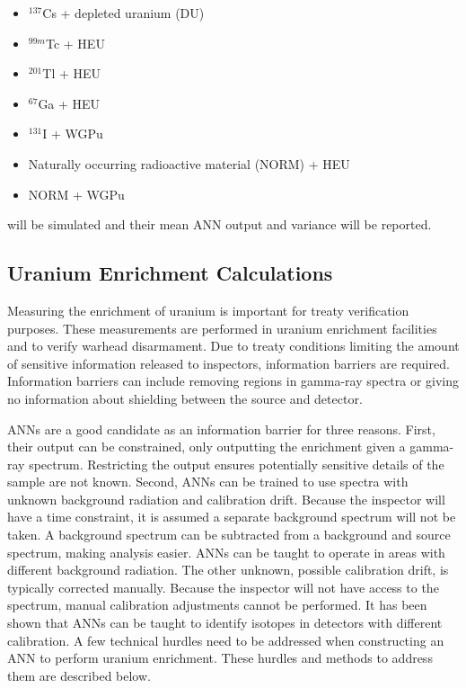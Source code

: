 \documentclass[tocnosub,noragright,centerchapter,12pt,fullpage]{uiucecethesis09}
\begin{document}
\begin{itemize}
  \item $^{137}$Cs + depleted uranium (DU)
  \item $^{99m}$Tc + HEU
  \item $^{201}$Tl + HEU
  \item $^{67}$Ga + HEU
  \item $^{131}$I + WGPu
  \item Naturally occurring radioactive material (NORM) + HEU
  \item NORM + WGPu
\end{itemize}

will be simulated and their mean ANN output and variance will be reported. 




\subsection{Uranium Enrichment Calculations}

Measuring the enrichment of uranium is important for treaty verification purposes. These measurements are performed in uranium enrichment facilities and to verify warhead disarmament. Due to treaty conditions limiting the amount of sensitive information released to inspectors, information barriers are required. Information barriers can include removing regions in gamma-ray spectra or giving no information about shielding between the source and detector. 

ANNs are a good candidate as an information barrier for three reasons. First, their output can be constrained, only outputting the enrichment given a gamma-ray spectrum. Restricting the output ensures potentially sensitive details of the sample are not known. Second, ANNs can be trained to use spectra with unknown background radiation and calibration drift. Because the inspector will have a time constraint, it is assumed a separate background spectrum will not be taken. A background spectrum can be subtracted from a background and source spectrum, making analysis easier. ANNs can be taught to operate in areas with different background radiation. The other unknown, possible calibration drift, is typically corrected manually. Because the inspector will not have access to the spectrum, manual calibration adjustments cannot be performed. It has been shown that ANNs can be taught to identify isotopes in detectors with different calibration.  A few technical hurdles need to be addressed when constructing an ANN to perform uranium enrichment. These hurdles and methods to address them are described below.
\end{document}
